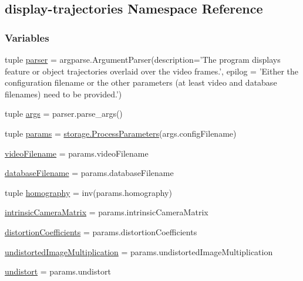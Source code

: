 \hypertarget{namespacedisplay-trajectories}{\subsection{display-\/trajectories Namespace Reference}
\label{namespacedisplay-trajectories}
}
\subsubsection*{Variables}
\begin{DoxyCompactItemize}
\item 
tuple \hyperlink{namespacedisplay-trajectories_ae474cf08ec327159b17d0b6ae3e64602}{parser} = argparse.\-Argument\-Parser(description='The program displays feature or object trajectories overlaid over the video frames.', epilog = 'Either the configuration filename or the other parameters (at least video and database filenames) need to be provided.')
\item 
tuple \hyperlink{namespacedisplay-trajectories_aa96131c1a01682890e5a1d26bc810234}{args} = parser.\-parse\-\_\-args()
\item 
tuple \hyperlink{namespacedisplay-trajectories_af9fd82e2edc80c974749eadfb0d1570a}{params} = \hyperlink{classstorage_1_1ProcessParameters}{storage.\-Process\-Parameters}(args.\-config\-Filename)
\item 
\hyperlink{namespacedisplay-trajectories_ac49ed52409b0ea70ec785d5d511ba23d}{video\-Filename} = params.\-video\-Filename
\item 
\hyperlink{namespacedisplay-trajectories_a43b07df78fee39f08977f07a606d4b32}{database\-Filename} = params.\-database\-Filename
\item 
tuple \hyperlink{namespacedisplay-trajectories_af552b3670a92c4887839b96ffddcffa6}{homography} = inv(params.\-homography)
\item 
\hyperlink{namespacedisplay-trajectories_ac1160412f43bb2d12b5a99af69632f18}{intrinsic\-Camera\-Matrix} = params.\-intrinsic\-Camera\-Matrix
\item 
\hyperlink{namespacedisplay-trajectories_a4bc3c259d628ba2e71c96e346789824c}{distortion\-Coefficients} = params.\-distortion\-Coefficients
\item 
\hyperlink{namespacedisplay-trajectories_a7ba37ec5f26e7111c0120702cab55085}{undistorted\-Image\-Multiplication} = params.\-undistorted\-Image\-Multiplication
\item 
\hyperlink{namespacedisplay-trajectories_a252ba7661bb1423b9fb3404b78b2efb9}{undistort} = params.\-undistort

\end{DoxyCompactItemize}
